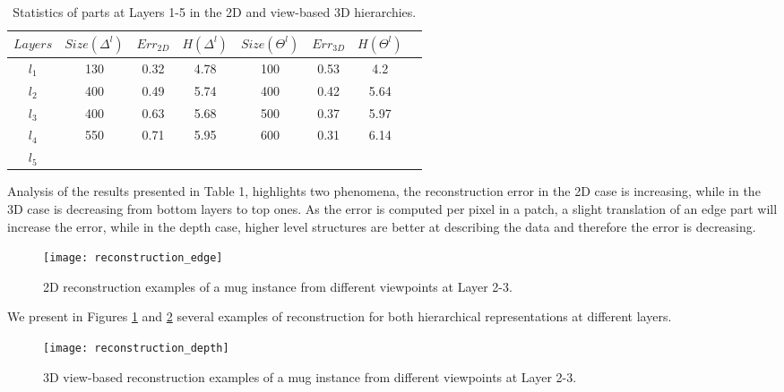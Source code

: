 \documentclass[runningheads]{llncs}
\begin{document}
 \begin{table}
 \begin{center}
  \begin{tabular}{ | c | c | c | c | c | c | c |r |}
      \hline
      $Layers$  & $Size(\Delta^l)$ & $Err_{2D}$ & $H(\Delta^l)$ &  $Size(\Theta^l)$ & $Err_{3D}$ & $H(\Theta^l)$  \\ \hline
    $l_1$ &  130  & 0.32 & 4.78 & 100 & 0.53 & 4.2 \\ \hline
    $l_2$ &  400 & 0.49 & 5.74 & 400 & 0.42 & 5.64 \\ \hline
    $l_3$ &  400 & 0.63 & 5.68 & 500 & 0.37 & 5.97 \\ \hline 
    $l_4$ &  550 & 0.71 & 5.95 & 600 & 0.31 & 6.14 \\ \hline
    $l_5$ &   &  &  &  &  &  \\ 
    \hline
  \end{tabular}
\end{center}
\caption{Statistics of parts at Layers 1-5 in the 2D and view-based 3D hierarchies.}
\end{table}

Analysis of the results presented in Table 1, highlights two phenomena, the reconstruction error in the 2D case is increasing, while in the 3D case is decreasing from bottom layers to top ones. As the error is computed per pixel in a patch, a slight translation of an edge part will increase the error, while in the depth case, higher level structures are better at describing the data and therefore the error is decreasing. 

\begin{figure}
\begin{center}
\texttt{[image: reconstruction\_edge]}
\end{center}
\caption{2D reconstruction examples of a mug instance from different viewpoints at Layer 2-3.}
\label{reconstructionEdge}
\end{figure}

We present in Figures \ref{reconstructionEdge} and \ref{reconstructionDepth} several examples of reconstruction for both hierarchical representations at different layers. 

\begin{figure}
\begin{center}
\texttt{[image: reconstruction\_depth]}
\end{center}
\caption{3D view-based reconstruction examples of a mug instance from different viewpoints at Layer 2-3.}
\label{reconstructionDepth}
\end{figure}
\end{document}
